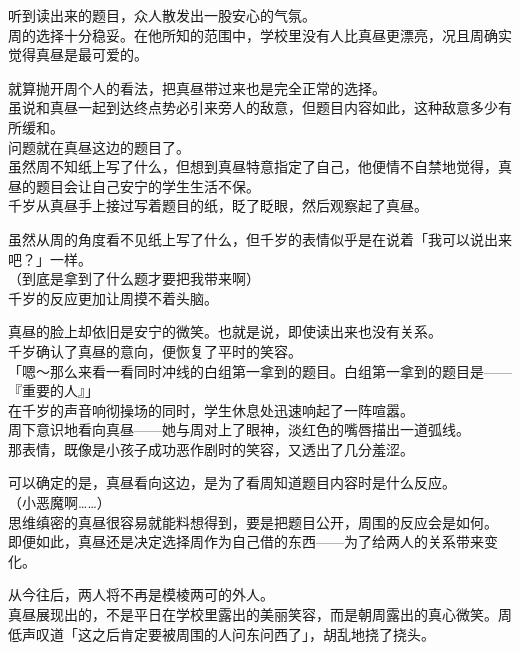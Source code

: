 听到读出来的题目，众人散发出一股安心的气氛。\\

周的选择十分稳妥。在他所知的范围中，学校里没有人比真昼更漂亮，况且周确实觉得真昼是最可爱的。

就算抛开周个人的看法，把真昼带过来也是完全正常的选择。\\

虽说和真昼一起到达终点势必引来旁人的敌意，但题目内容如此，这种敌意多少有所缓和。\\

问题就在真昼这边的题目了。\\

虽然周不知纸上写了什么，但想到真昼特意指定了自己，他便情不自禁地觉得，真昼的题目会让自己安宁的学生生活不保。\\

千岁从真昼手上接过写着题目的纸，眨了眨眼，然后观察起了真昼。

虽然从周的角度看不见纸上写了什么，但千岁的表情似乎是在说着「我可以说出来吧？」一样。\\

（到底是拿到了什么题才要把我带来啊）\\

千岁的反应更加让周摸不着头脑。

真昼的脸上却依旧是安宁的微笑。也就是说，即使读出来也没有关系。\\

千岁确认了真昼的意向，便恢复了平时的笑容。\\

「嗯～那么来看一看同时冲线的白组第一拿到的题目。白组第一拿到的题目是——『重要的人』」\\

在千岁的声音响彻操场的同时，学生休息处迅速响起了一阵喧嚣。\\

周下意识地看向真昼——她与周对上了眼神，淡红色的嘴唇描出一道弧线。\\

那表情，既像是小孩子成功恶作剧时的笑容，又透出了几分羞涩。

可以确定的是，真昼看向这边，是为了看周知道题目内容时是什么反应。\\

（小恶魔啊……）\\

思维缜密的真昼很容易就能料想得到，要是把题目公开，周围的反应会是如何。\\

即便如此，真昼还是决定选择周作为自己借的东西——为了给两人的关系带来变化。

从今往后，两人将不再是模棱两可的外人。\\

真昼展现出的，不是平日在学校里露出的美丽笑容，而是朝周露出的真心微笑。周低声叹道「这之后肯定要被周围的人问东问西了」，胡乱地挠了挠头。
